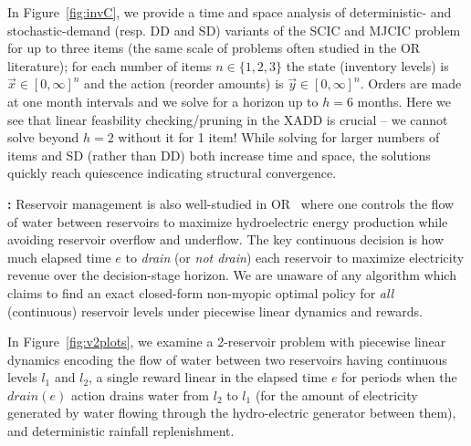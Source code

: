 In Figure~\ref{fig:invC}, we provide a time and space analysis of
deterministic- and stochastic-demand (resp. DD and SD) variants of the
SCIC and MJCIC problem for up to three items (the same scale of
problems often studied in the OR literature); for each number of items
$n \in \{ 1,2,3 \}$ the state (inventory levels) is $\vec{x} \in
[0,\infty]^n$ and the action (reorder amounts) is $\vec{y} \in
[0,\infty]^n$.  Orders are made at one month intervals and we solve
for a horizon up to $h=6$ months.  Here we see that linear feasbility
checking/pruning in the XADD is crucial -- we cannot solve beyond
$h=2$ without it for 1 item!  While solving for larger numbers of
items and SD (rather than DD) both increase time and space, 
the solutions quickly reach quiescence indicating structural
convergence.


{\bf \WaterReservoir:} Reservoir management is also
well-studied in OR~\cite{Mahootchi2009,Yeh1985} where
one controls the flow of water between reservoirs to maximize hydroelectric
energy production while avoiding reservoir overflow
and underflow.  The key continuous decision
is how much elapsed time $e$ to 
\emph{drain} (or \emph{not drain}) each reservoir to maximize
electricity revenue over the decision-stage horizon.  
We are unaware of any algorithm which claims 
to find an exact closed-form non-myopic
optimal policy for \emph{all} (continuous) reservoir levels
under piecewise linear dynamics and rewards.

In Figure~\ref{fig:v2plots}, we examine a 2-reservoir problem with
piecewise linear dynamics encoding the flow of water between two
reservoirs having continuous levels $l_1$ and $l_2$, a single reward
linear in the elapsed time $e$ for periods when the
$\mathit{drain}(e)$ action drains water from $l_2$ to $l_1$ (for the
amount of electricity generated by water flowing through the
hydro-electric generator between them), and deterministic 
rainfall replenishment.


